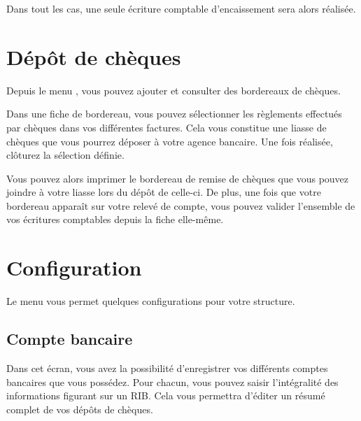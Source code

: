 \documentclass[a4paper,10pt,oneside,french]{sphinxmanual}
\begin{document}
Dans tout les cas, une seule écriture comptable d’encaissement sera alors réalisée.


\section{Dépôt de chèques}
\label{\detokenize{payoff/deposit:depot-de-cheques}}\label{\detokenize{payoff/deposit::doc}}
Depuis le menu , vous pouvez ajouter et consulter des bordereaux de chèques.
\begin{quote}

\noindent{}
\end{quote}

Dans une fiche de bordereau, vous pouvez sélectionner les règlements effectués par chèques dans vos différentes factures.
Cela vous constitue une liasse de chèques que vous pourrez déposer à votre agence bancaire.
Une fois réalisée, clôturez la sélection définie.
\begin{quote}

\noindent{}
\end{quote}

Vous pouvez alors imprimer le bordereau de remise de chèques que vous pouvez joindre à votre liasse lors du dépôt de celle-ci.
De plus, une fois que votre bordereau apparaît sur votre relevé de compte, vous pouvez valider l’ensemble de vos écritures comptables depuis la fiche elle-même.


\section{Configuration}
\label{\detokenize{payoff/config:configuration}}\label{\detokenize{payoff/config::doc}}
Le menu  vous permet quelques configurations pour votre structure.


\subsection{Compte bancaire}
\label{\detokenize{payoff/config:compte-bancaire}}
Dans cet écran, vous avez la possibilité d’enregistrer vos différents comptes bancaires que vous possédez.
Pour chacun, vous pouvez saisir l’intégralité des informations figurant sur un RIB.
Cela vous permettra d’éditer un résumé complet de vos dépôts de chèques.
\end{document}
